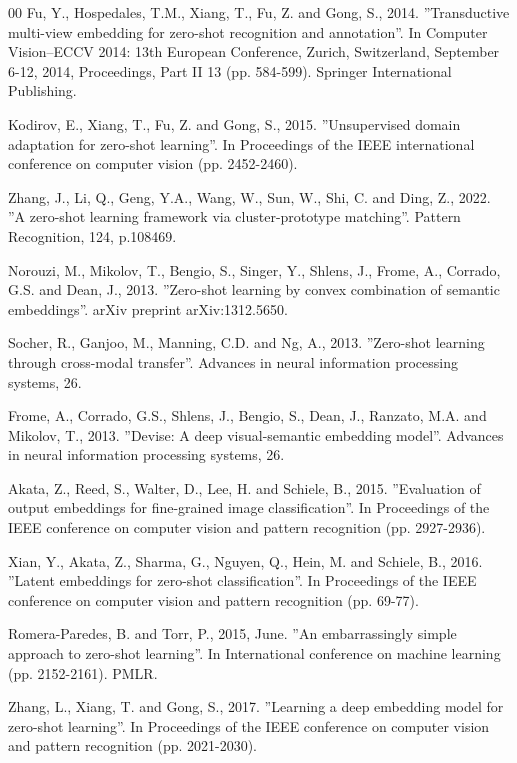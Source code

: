\documentclass{article}
\begin{document}
\begin{thebibliography}{00}
 Fu, Y., Hospedales, T.M., Xiang, T., Fu, Z. and Gong, S., 2014. ''Transductive multi-view embedding for zero-shot recognition and annotation''. In Computer Vision–ECCV 2014: 13th European Conference, Zurich, Switzerland, September 6-12, 2014, Proceedings, Part II 13 (pp. 584-599). Springer International Publishing.

 Kodirov, E., Xiang, T., Fu, Z. and Gong, S., 2015. ''Unsupervised domain adaptation for zero-shot learning''. In Proceedings of the IEEE international conference on computer vision (pp. 2452-2460).

 Zhang, J., Li, Q., Geng, Y.A., Wang, W., Sun, W., Shi, C. and Ding, Z., 2022. ''A zero-shot learning framework via cluster-prototype matching''. Pattern Recognition, 124, p.108469.

 Norouzi, M., Mikolov, T., Bengio, S., Singer, Y., Shlens, J., Frome, A., Corrado, G.S. and Dean, J., 2013. ''Zero-shot learning by convex combination of semantic embeddings''. arXiv preprint arXiv:1312.5650.

 Socher, R., Ganjoo, M., Manning, C.D. and Ng, A., 2013. ''Zero-shot learning through cross-modal transfer''. Advances in neural information processing systems, 26.

 Frome, A., Corrado, G.S., Shlens, J., Bengio, S., Dean, J., Ranzato, M.A. and Mikolov, T., 2013. ''Devise: A deep visual-semantic embedding model''. Advances in neural information processing systems, 26.

 Akata, Z., Reed, S., Walter, D., Lee, H. and Schiele, B., 2015. ''Evaluation of output embeddings for fine-grained image classification''. In Proceedings of the IEEE conference on computer vision and pattern recognition (pp. 2927-2936).

 Xian, Y., Akata, Z., Sharma, G., Nguyen, Q., Hein, M. and Schiele, B., 2016. ''Latent embeddings for zero-shot classification''. In Proceedings of the IEEE conference on computer vision and pattern recognition (pp. 69-77).

 Romera-Paredes, B. and Torr, P., 2015, June. ''An embarrassingly simple approach to zero-shot learning''. In International conference on machine learning (pp. 2152-2161). PMLR.

 Zhang, L., Xiang, T. and Gong, S., 2017. ''Learning a deep embedding model for zero-shot learning''. In Proceedings of the IEEE conference on computer vision and pattern recognition (pp. 2021-2030).


\end{thebibliography}
\end{document}
